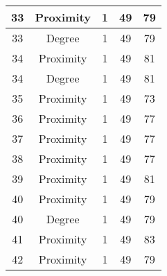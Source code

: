 \documentclass[results.tex]{subfiles}
\begin{document}
\begin{center}
\begin{tabular}{| c || c | c | c | c |}
            \hline
            33                      & Proximity                    & 1                      & 49                      & 79                   \\
            \hline
            33                      & Degree                       & 1                      & 49                      & 79                   \\
            \hline
            34                      & Proximity                    & 1                      & 49                      & 81                   \\
            \hline
            34                      & Degree                       & 1                      & 49                      & 81                   \\
            \hline
            35                      & Proximity                    & 1                      & 49                      & 73                   \\
            \hline
            36                      & Proximity                    & 1                      & 49                      & 77                   \\
            \hline
            37                      & Proximity                    & 1                      & 49                      & 77                   \\
            \hline
            38                      & Proximity                    & 1                      & 49                      & 77                   \\
            \hline
            39                      & Proximity                    & 1                      & 49                      & 81                   \\
            \hline
            40                      & Proximity                    & 1                      & 49                      & 79                   \\
            \hline
            40                      & Degree                       & 1                      & 49                      & 79                   \\
            \hline
            41                      & Proximity                    & 1                      & 49                      & 83                   \\
            \hline
            42                      & Proximity                    & 1                      & 49                      & 79                   \\

\end{tabular}
\end{center}
\end{document}
